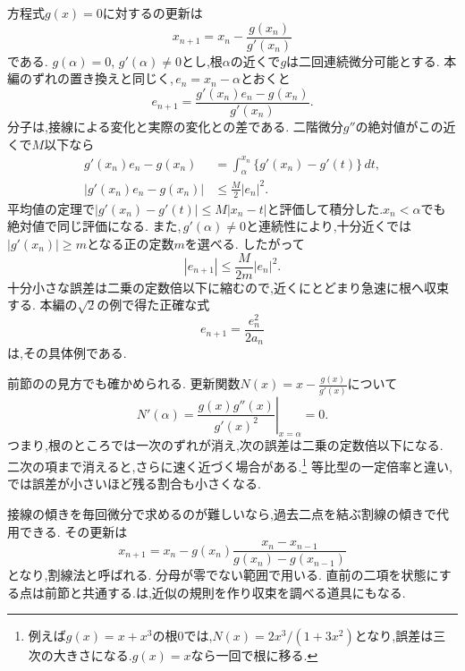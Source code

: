 方程式$g(x)=0$に対するの更新は
\[
  x_{n+1}=x_n-\frac{g(x_n)}{g'(x_n)}
\]
である.
$g(\alpha)=0$, $g'(\alpha)\ne0$とし,根$\alpha$の近くで$g$は二回連続微分可能とする.
本編のずれの置き換えと同じく,\,$e_n=x_n-\alpha$とおくと
\[
  e_{n+1}
  =\frac{g'(x_n)e_n-g(x_n)}{g'(x_n)}.
\]
分子は,接線による変化と実際の変化との差である.
二階微分$g''$の絶対値がこの近くで$M$以下なら
\[
  \begin{aligned}
    g'(x_n)e_n-g(x_n)
      &=\int_\alpha^{x_n}\{g'(x_n)-g'(t)\}\,dt,\\
    |g'(x_n)e_n-g(x_n)|
      &\le \frac{M}{2}|e_n|^2.
  \end{aligned}
\]
平均値の定理で$|g'(x_n)-g'(t)|\le M|x_n-t|$と評価して積分した.$x_n<\alpha$でも絶対値で同じ評価になる.
また,\,$g'(\alpha)\ne0$と連続性により,十分近くでは$|g'(x_n)|\ge m$となる正の定数$m$を選べる.
したがって
\[
  |e_{n+1}|\le\frac{M}{2m}|e_n|^2.
\]
十分小さな誤差は二乗の定数倍以下に縮むので,近くにとどまり急速に根へ収束する.
本編の$\sqrt2$の例で得た正確な式
\[
  e_{n+1}=\frac{e_n^2}{2a_n}
\]
は,その具体例である.

前節のの見方でも確かめられる.
更新関数$\displaystyle N(x)=x-\frac{g(x)}{g'(x)}$について
\[
  N'(\alpha)
  =\left.\frac{g(x)g''(x)}{g'(x)^2}\right|_{x=\alpha}=0.
\]
つまり,根のところでは一次のずれが消え,次の誤差は二乗の定数倍以下になる.
二次の項まで消えると,さらに速く近づく場合がある.\footnote{例えば$g(x)=x+x^3$の根$0$では,$N(x)=2x^3/(1+3x^2)$となり,誤差は三次の大きさになる.$g(x)=x$なら一回で根に移る.}
等比型の一定倍率と違い,では誤差が小さいほど残る割合も小さくなる.

接線の傾きを毎回微分で求めるのが難しいなら,過去二点を結ぶ割線の傾きで代用できる.
その更新は
\[
  x_{n+1}
  =x_n-g(x_n)\frac{x_n-x_{n-1}}{g(x_n)-g(x_{n-1})}
\]
となり,割線法と呼ばれる.
分母が零でない範囲で用いる.
直前の二項を状態にする点は前節と共通する.は,近似の規則を作り収束を調べる道具にもなる.
